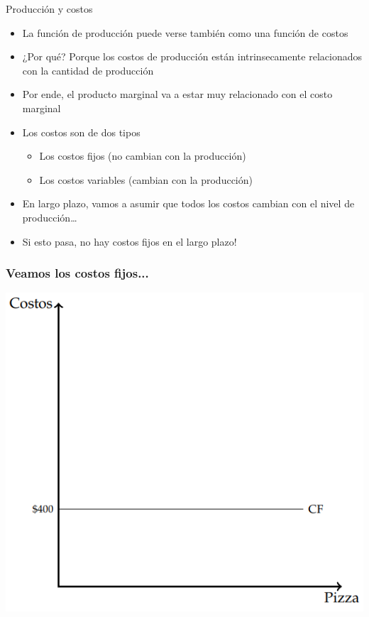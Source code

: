 \documentclass{beamer}
\begin{document}
\begin{frame}{Producción y costos}
\begin{itemize}
    \item La función de producción puede verse también como una función de costos
    \item ¿Por qué? Porque los costos de producción están intrinsecamente relacionados con la cantidad de producción
    \item Por ende, el producto marginal va a estar muy relacionado con el costo marginal
    \item Los costos son de dos tipos
    \begin{itemize} 
        \item Los costos fijos (no cambian con la producción)
        \item Los costos variables (cambian con la producción)
    \end{itemize}
    \item En largo plazo, vamos a asumir que todos los costos cambian con el nivel de producción\dots
    \item Si esto pasa, no hay costos fijos en el largo plazo!
\end{itemize}
\end{frame}

\begin{frame}
\frametitle{Veamos los costos fijos...}
\centering
\includegraphics[scale=0.6]{../Figures/C13.1.png}
\end{frame}
\end{document}
